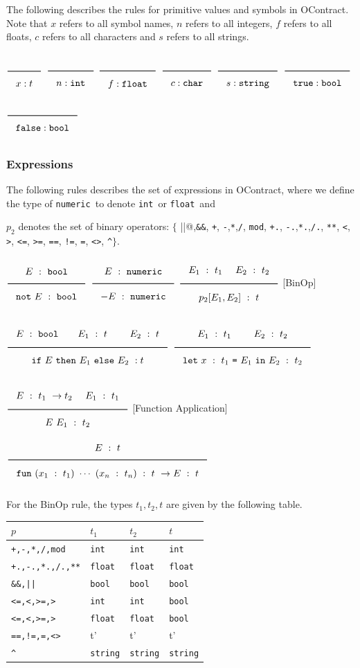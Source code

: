 \documentclass[a4paper]{article}
\newcommand{\Rule}[2]{\genfrac{}{}{0.7pt}{}{{\setlength{\fboxrule}{0pt}\setlength{\fboxsep}{3mm}\fbox{$#1$}}}{{\setlength{\fboxrule}{0pt}\setlength{\fboxsep}{3mm}\fbox{$#2$}}}}
\newcommand{\TruE}{\texttt{true}}
\newcommand{\FalsE}{\texttt{false}}
\newcommand{\Int}{\texttt{int}}
\newcommand{\Float}{\texttt{float}}
\newcommand{\String}{\texttt{string}}
\newcommand{\Char}{\texttt{char}}
\newcommand{\Num}{\texttt{numeric}}
\newcommand{\Bool}{\texttt{bool}}
\begin{document}
The following describes the rules for primitive values and symbols in OContract.
Note that $x$ refers to all symbol names, $n$ refers to all integers, $f$ refers to all floats,
$c$ refers to all characters and $s$ refers to all strings.

$\Rule{}{x : t}$
\hfill
$\Rule{}{n : \Int}$
\hfill
$\Rule{}{f : \Float}$
\hfill
$\Rule{}{c : \Char}$
\hfill
$\Rule{}{s : \String}$
\hfill
$\Rule{}{\TruE : \Bool}$
\hfill
$\Rule{}{\FalsE : \Bool}$

\subsubsection{Expressions}

The following rules describes the set of expressions in OContract,
where we define the type of \Num\ to denote \Int\ or \Float\ and

$p_2$ denotes the set of binary operators: $\{$
\verb@||@,\verb#&&#,
\verb#+#, \verb#-#,\verb#*#,\verb#/#, \verb#mod#,
\verb#+.#, \verb#-.#,\verb#*.#,\verb#/.#, \verb#**#,
\verb#<#, \verb#>#, \verb#<=#, \verb#>=#, \verb#==#, \verb#!=#, \verb#=#, \verb#<>#, \verb#^#$\}$.

$\Rule{E\ :\ \Bool}{\texttt{not}\ E\ :\ \Bool}$
\hfill
$\Rule{E\ :\ \Num}{- E\ :\ \Num}$
\hfill
$\Rule{E_1\ :\ t_1\ \quad E_2\ :\ t_2}{p_2[E_1, E_2]\ :\ t}$ [BinOp]

$\Rule{E\ :\ \Bool \qquad E_1\ :\ t\ \qquad E_2\ :\ t}{\texttt{if}\ E\ \texttt{then}\ E_1\ \texttt{else}\ E_2\ : t}$
\hfill
$\Rule{E_1\ :\ t_1\ \qquad E_2\ :\ t_2}{\texttt{let}\ x\ :\ t_1\ \texttt{=}\ E_1\ \texttt{in}\ E_2\ :\ t_2}$

$\Rule{E\ :\ t_1\ \rightarrow t_2\ \quad E_1\ :\ t_1}{E\ E_1\ :\ t_2}$ [Function Application]
\hfill
$\Rule{E\ :\ t}{\texttt{fun}\ (x_1\ :\ t_1)\ \cdots\ (x_n\ :\ t_n)\ :\ t\ \rightarrow E\ :\ t}$

For the BinOp rule, the types $t_1, t_2, t$ are given by the following table.

\begin{tabular}{|l||l|l|l|} \hline
$p$ & $t_1$ & $t_2$ & $t$ \\ \hline \hline
\verb#+,-,*,/,mod# & \Int & \Int & \Int \\ \hline
\verb#+.,-.,*.,/.,**# & \Float & \Float & \Float \\ \hline
\verb#&&,||#  & \Bool & \Bool & \Bool \\ \hline
\verb#<=,<,>=,># & \Int & \Int & \Bool \\ \hline
\verb#<=,<,>=,># & \Float & \Float & \Bool \\ \hline
\verb#==,!=,=,<># & t' & t' & t' \\ \hline
\verb#^# & \String & \String & \String \\ \hline
\end{tabular}
\vspace{3mm}
\end{document}
